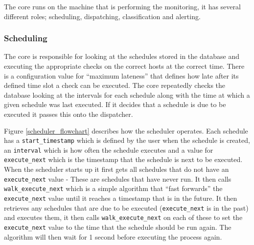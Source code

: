 \documentclass[bsc,deptreport,twoside,parskip,singlespacing,notimes]{infthesis}
\begin{document}
	The core runs on the machine that is performing the monitoring, it has several
	different roles; scheduling, dispatching, classification and alerting.

\subsubsection{Scheduling}

	The core is responsible for looking at the schedules stored in the database and
	executing the appropriate checks on the correct hosts at the correct time.
	There is a configuration value for ``maximum lateness'' that defines how late
	after its defined time slot a check can be executed.  The core repeatedly
	checks the database looking at the intervals for each schedule along with the
	time at which a given schedule was last executed.  If it decides that a
	schedule is due to be executed it passes this onto the dispatcher.


	Figure \ref{scheduler_flowchart} describes how the scheduler operates.  Each
	schedule has a \linebreak\texttt{start\_timestamp} which is defined by the user
	when the schedule is created, an \texttt{interval} which is how often the
	schedule executes and a value for \texttt{execute\_next} which is the timestamp
	that the schedule is next to be executed.  When the scheduler starts up it
	first gets all schedules that do not have an \texttt{execute\_next} value -
	These are schedules that have never run.  It then calls
	\texttt{walk\_execute\_next} which is a simple algorithm that ``fast forwards''
	the \texttt{execute\_next} value until it reaches a timestamp that is in the
	future.  It then retrieves any schedules that are due to be executed
	(\texttt{execute\_next} is in the past) and executes them, it then calls
	\texttt{walk\_execute\_next} on each of these to set the \texttt{execute\_next}
	value to the time that the schedule should be run again.  The algorithm will
	then wait for 1 second before executing the process again.
\end{document}
